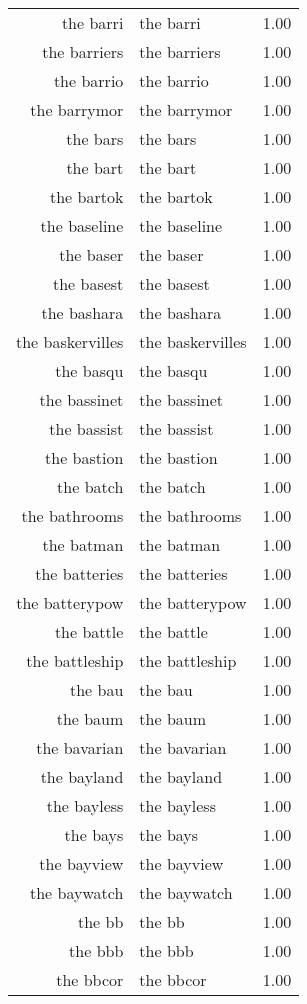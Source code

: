\begin{table}[ht]
\begin{tabular}{rlr}
  the barri & the barri & 1.00 \\ 
  the barriers & the barriers & 1.00 \\ 
  the barrio & the barrio & 1.00 \\ 
  the barrymor & the barrymor & 1.00 \\ 
  the bars & the bars & 1.00 \\ 
  the bart & the bart & 1.00 \\ 
  the bartok & the bartok & 1.00 \\ 
  the baseline & the baseline & 1.00 \\ 
  the baser & the baser & 1.00 \\ 
  the basest & the basest & 1.00 \\ 
  the bashara & the bashara & 1.00 \\ 
  the baskervilles & the baskervilles & 1.00 \\ 
  the basqu & the basqu & 1.00 \\ 
  the bassinet & the bassinet & 1.00 \\ 
  the bassist & the bassist & 1.00 \\ 
  the bastion & the bastion & 1.00 \\ 
  the batch & the batch & 1.00 \\ 
  the bathrooms & the bathrooms & 1.00 \\ 
  the batman & the batman & 1.00 \\ 
  the batteries & the batteries & 1.00 \\ 
  the batterypow & the batterypow & 1.00 \\ 
  the battle & the battle & 1.00 \\ 
  the battleship & the battleship & 1.00 \\ 
  the bau & the bau & 1.00 \\ 
  the baum & the baum & 1.00 \\ 
  the bavarian & the bavarian & 1.00 \\ 
  the bayland & the bayland & 1.00 \\ 
  the bayless & the bayless & 1.00 \\ 
  the bays & the bays & 1.00 \\ 
  the bayview & the bayview & 1.00 \\ 
  the baywatch & the baywatch & 1.00 \\ 
  the bb & the bb & 1.00 \\ 
  the bbb & the bbb & 1.00 \\ 
  the bbcor & the bbcor & 1.00 \\ 

\end{tabular}
\end{table}
